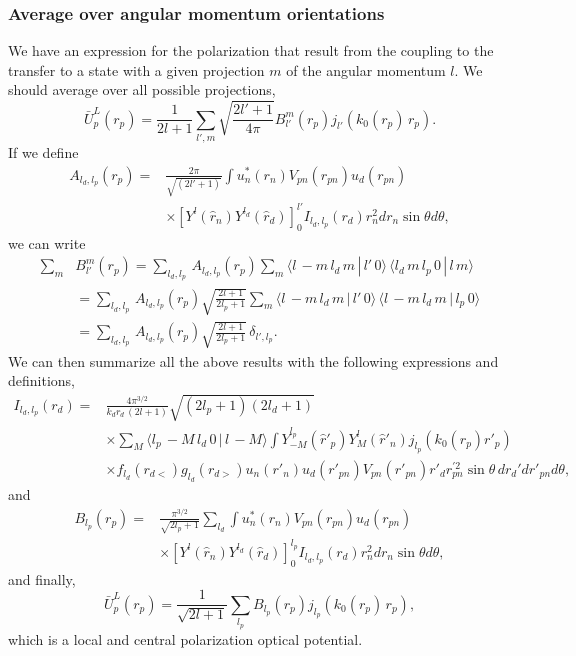 \documentclass[a4paper,11pt]{article}
\begin{document}
\subsubsection{Average over angular momentum orientations} 
We have an expression for the polarization that result from the coupling to the transfer to a state with a given projection $m$ of the angular momentum $l$. We should average over all possible projections, 
 \begin{equation}\label{eq79}
 \bar U^L_p(r_p)=\frac{1}{2l+1}\sum_{l',m}\sqrt{\frac{2l'+1}{4\pi}} B^m_{l'}(r_p)j_{l'}(k_0(r_p) \,r_p).
 \end{equation}
 If we define 
  \begin{align}\label{eq81}
  \nonumber A_{l_d,l_p}(r_p)=&\frac{2\pi}{\sqrt{(2l'+1)}}\int u_n^*(r_n)V_{pn}(r_{pn})u_d(r_{pn})\\
  &\times  \left[Y^{l}(\hat r_n)Y^{l_d}(\hat r_d)\right]^{l'}_0 I_{l_d,l_p}(r_d)r^2_n d r_n \sin\theta d\theta,
  \end{align}
we can write
\begin{align}\label{eq80}
\nonumber    \sum_m &B^m_{l'}(r_p)=\sum_{l_d,l_p}\,A_{l_d,l_p}(r_p)\sum_m \langle l\,-m\,l_d\,m\,|\,l'\,0\rangle\,\langle l_d\,m\,l_p\,0\,|\,l\,m\rangle \\
&=\sum_{l_d,l_p}\,A_{l_d,l_p}(r_p)\sqrt{\frac{2l+1}{2l_p+1}}\sum_m \langle l\,-m\,l_d\,m\,|\,l'\,0\rangle\,\langle l\,-m\,l_d\,m\,|\,l_p\,0\rangle\\
&=\sum_{l_d,l_p}\,A_{l_d,l_p}(r_p)\sqrt{\frac{2l+1}{2l_p+1}}\,\delta_{l',l_p}.
\end{align}
We can then summarize all the above results with the following expressions and definitions,
 \begin{align}\label{eq83}
 \nonumber I_{l_d,l_p}(r_d)=&\frac{4\pi^{3/2}}{k_dr_d\,(2l+1)}\sqrt{(2l_p+1)(2l_d+1)}\\
 \nonumber&\times\sum_{M}\langle l_p\,-M\,l_d\,0\,|\,l\,-M\rangle  \int  Y^{l_p}_{-M}(\hat r'_p)Y^{l}_{M}(\hat r'_n)j_{l_p}(k_0(r_p) r'_p)\\
 &\times f_{l_d}(r_{d<})g_{l_d}(r_{d>})u_n(r'_n)u_d(r'_{pn}) V_{pn}(r'_{pn}) r'_dr_{pn}^{'2}\sin\theta\, d r_d'dr'_{pn}d\theta,
 \end{align}
 and
 \begin{align}\label{eq82}
 \nonumber B_{l_p}(r_p)=&\frac{\pi^{3/2}}{\sqrt{2l_p+1}}\sum_{l_d}\int u_n^*(r_n)V_{pn}(r_{pn})u_d(r_{pn})\\
 &\times  \left[Y^{l}(\hat r_n)Y^{l_d}(\hat r_d)\right]^{l_p}_0 I_{l_d,l_p}(r_d)r^2_n d r_n \sin\theta d\theta,
 \end{align}
 and finally,
 \begin{equation}\label{eq84}
 \bar U^L_p(r_p)=\frac{1}{\sqrt{2l+1}}\sum_{l_p} B_{l_p}(r_p)j_{l_p}(k_0(r_p) \,r_p),
 \end{equation} 
which is a local and central polarization optical potential.
\end{document}
